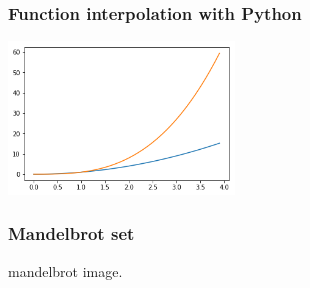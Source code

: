 \documentclass[10pt]{beamer}
\begin{document}
\begin{frame}
  \frametitle{Function interpolation with Python}



  \begin{center}
    \includegraphics[width = 6cm]{images/two_functions.png}
  \end{center}

\end{frame}

\begin{frame}
  \frametitle{Mandelbrot set}

  mandelbrot image.

\end{frame}
\end{document}
